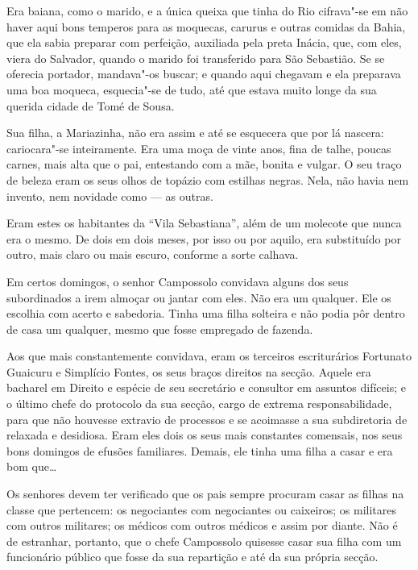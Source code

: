 Era baiana, como o marido, e a única queixa que tinha do Rio cifrava"-se
em não haver aqui bons temperos para as moquecas, carurus e outras
comidas da Bahia, que ela sabia preparar com perfeição, auxiliada pela
preta Inácia, que, com eles, viera do Salvador, quando o marido foi
transferido para São Sebastião. Se se oferecia portador, mandava"-os
buscar; e quando aqui chegavam e ela preparava uma boa moqueca,
esquecia"-se de tudo, até que estava muito longe da sua querida cidade de
Tomé de Sousa.

Sua filha, a Mariazinha, não era assim e até se esquecera que por lá
nascera: cariocara"-se inteiramente. Era uma moça de vinte anos, fina de
talhe, poucas carnes, mais alta que o pai, entestando com a mãe, bonita
e vulgar. O seu traço de beleza eram os seus olhos de topázio com
estilhas negras. Nela, não havia nem invento, nem novidade como --- as
outras.

Eram estes os habitantes da ``Vila Sebastiana'', além de um molecote que
nunca era o mesmo. De dois em dois meses, por isso ou por aquilo, era
substituído por outro, mais claro ou mais escuro, conforme a sorte
calhava.

Em certos domingos, o senhor Campossolo convidava alguns dos seus
subordinados a irem almoçar ou jantar com eles. Não era um qualquer. Ele
os escolhia com acerto e sabedoria. Tinha uma filha solteira e não podia
pôr dentro de casa um qualquer, mesmo que fosse empregado de fazenda.

Aos que mais constantemente convidava, eram os terceiros escriturários
Fortunato Guaicuru e Simplício Fontes, os seus braços direitos na
secção. Aquele era bacharel em Direito e espécie de seu secretário e
consultor em assuntos difíceis; e o último chefe do protocolo da sua
secção, cargo de extrema responsabilidade, para que não houvesse
extravio de processos e se acoimasse a sua subdiretoria de relaxada e
desidiosa. Eram eles dois os seus mais constantes comensais, nos seus
bons domingos de efusões familiares. Demais, ele tinha uma filha a casar
e era bom que\ldots{}

Os senhores devem ter verificado que os pais sempre procuram casar as
filhas na classe que pertencem: os negociantes com negociantes ou
caixeiros; os militares com outros militares; os médicos com outros
médicos e assim por diante. Não é de estranhar, portanto, que o chefe
Campossolo quisesse casar sua filha com um funcionário público que fosse
da sua repartição e até da sua própria secção.

